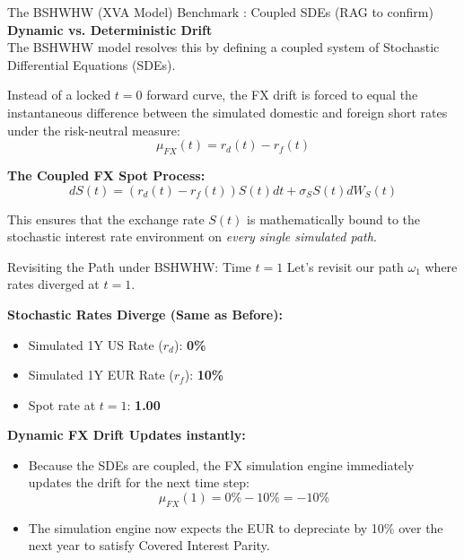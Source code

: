 \documentclass{beamer}
\begin{document}
	
	\begin{frame}{The BSHWHW (XVA Model) Benchmark : Coupled SDEs (RAG to confirm)}
		\textbf{Dynamic vs. Deterministic Drift} \\
		The BSHWHW model resolves this by defining a coupled system of Stochastic Differential Equations (SDEs). 
		
		\vspace{0.3cm}
		Instead of a locked $t=0$ forward curve, the FX drift is forced to equal the instantaneous difference between the simulated domestic and foreign short rates under the risk-neutral measure:
		$$\mu_{FX}(t) = r_d(t) - r_f(t)$$
		
		\vspace{0.3cm}
		\textbf{The Coupled FX Spot Process:}
		$$dS(t) = \left( r_d(t) - r_f(t) \right)S(t)dt + \sigma_S S(t)dW_S(t)$$
		
		This ensures that the exchange rate $S(t)$ is mathematically bound to the stochastic interest rate environment on \textit{every single simulated path}.
	\end{frame}
	
	\begin{frame}{Revisiting the Path under BSHWHW: Time $t=1$}
		Let's revisit our path $\omega_1$ where rates diverged at $t=1$.
		
		\vspace{0.5cm}
		\textbf{Stochastic Rates Diverge (Same as Before):}
		\begin{itemize}
			\item Simulated 1Y US Rate ($r_d$): \textbf{0\%}
			\item Simulated 1Y EUR Rate ($r_f$): \textbf{10\%}
			\item Spot rate at $t=1$: \textbf{1.00}
		\end{itemize}
		
		\vspace{0.5cm}
		\textbf{Dynamic FX Drift Updates instantly:}
		\begin{itemize}
			\item Because the SDEs are coupled, the FX simulation engine immediately updates the drift for the next time step: 
			$$\mu_{FX}(1) = 0\% - 10\% = -10\%$$
			\item The simulation engine now expects the EUR to depreciate by 10\% over the next year to satisfy Covered Interest Parity.
		\end{itemize}
	\end{frame}
	
\end{document}
